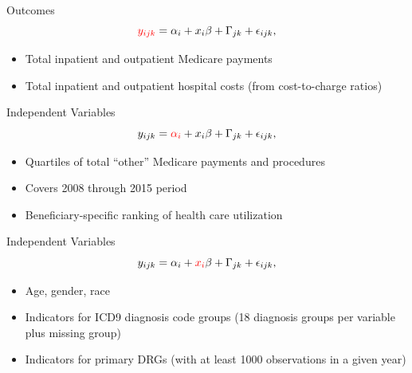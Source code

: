 \documentclass[t,aspectratio=169]{beamer}
\begin{document}
\begin{frame}{Outcomes}
    \begin{equation*}
        \textcolor{red}{y_{ijk}} = \alpha_{i} + x_{i}\beta + \Gamma_{jk} + \epsilon_{ijk},
    \end{equation*}

    \begin{itemize}
        \item Total inpatient and outpatient Medicare payments
        \item Total inpatient and outpatient hospital costs (from cost-to-charge ratios)
    \end{itemize}
\end{frame}

\begin{frame}{Independent Variables}
    \begin{equation*}
        y_{ijk} = \textcolor{red}{\alpha_{i}} + x_{i}\beta + \Gamma_{jk} + \epsilon_{ijk},
    \end{equation*}

    \begin{itemize}
        \item Quartiles of total ``other'' Medicare payments and procedures
        \item Covers 2008 through 2015 period
        \item Beneficiary-specific ranking of health care utilization
    \end{itemize}
\end{frame}

\begin{frame}{Independent Variables}
    \begin{equation*}
        y_{ijk} = \alpha_{i} + \textcolor{red}{x_{i}}\beta + \Gamma_{jk} + \epsilon_{ijk},
    \end{equation*}

    \begin{itemize}
        \item Age, gender, race
        \item Indicators for ICD9 diagnosis code groups (18 diagnosis groups per variable plus missing group)
        \item Indicators for primary DRGs (with at least 1000 observations in a given year)
    \end{itemize}
\end{frame}
\end{document}
